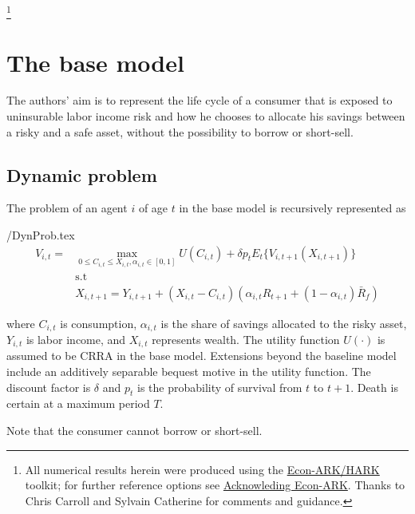 \documentclass[./CGMPort.tex]{subfiles}
\begin{document}
\thanks{All numerical results herein were produced using the \href{https://econ-ark/HARK}{Econ-ARK/HARK} toolkit; for further reference options see \href{https://econ-ark.org/acknowledging/}{Acknowleding Econ-ARK}.  Thanks to Chris Carroll and Sylvain Catherine for comments and guidance.}

\titlepagefinish

\newtheorem{defn}{Definition}
\newtheorem{theorem}{Theorem}

\hypertarget{The-base-model}{}
\section{The base model}

The authors' aim is to represent the life cycle of a consumer that is exposed to uninsurable labor income risk and how he chooses to allocate his savings between a risky and a safe asset, without the possibility to borrow or short-sell.

\subsection{Dynamic problem}

The problem of an agent $i$ of age $t$ in the base model is recursively represented as

\begin{verbatimwrite}{\EqDir/DynProb.tex}
	\begin{align}
		V_{i,t} =& \max_{0\leq C_{i,t} \leq X_{i,t}, \alpha_{i,t}\in[0,1]} U(C_{i,t}) + \delta p_t E_t\{ V_{i,t+1} (X_{i,t+1}) \}\\
		&\text{s.t} \nonumber \\
		&X_{i,t+1} = Y_{i,t+1} + (X_{i,t} - C_{i,t})(\alpha_{i,t} R_{t+1} + (1-\alpha_{i,t})\bar{R}_f)
	\end{align}
\end{verbatimwrite}

where $C_{i,t}$ is consumption, $\alpha_{i,t}$ is the share of savings 
allocated to the risky asset, $Y_{i,t}$ is labor income, and $X_{i,t}$ 
represents wealth. The utility function $U(\cdot)$ is assumed to be CRRA in the 
base model. Extensions beyond the baseline model include an additively 
separable bequest motive in the utility function. The discount factor is 
$\delta$ and $p_t$ is the probability of survival from $t$ to $t+1$. Death is 
certain at a maximum period $T$.

Note that the consumer cannot borrow or short-sell.
\end{document}
